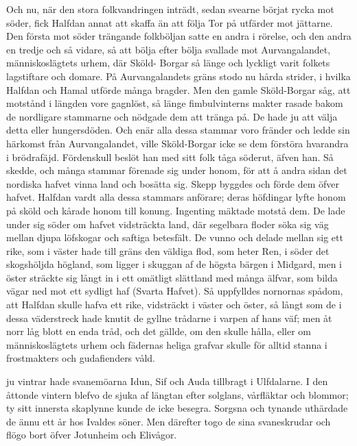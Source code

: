 Och nu, när den stora folkvandringen inträdt, sedan svearne börjat rycka
mot söder, fick Halfdan annat att skaffa än att följa Tor på utfärder
mot jättarne. Den första mot söder trängande folkböljan satte en andra i
rörelse, och den andra en tredje och så vidare, så att bölja efter bölja
svallade mot Aurvangalandet, människoslägtets urhem, där Sköld- Borgar
så länge och lyckligt varit folkets lagstiftare och domare. På
Aurvangalandets gräns stodo nu hårda strider, i hvilka Halfdan och Hamal
utförde många bragder. Men den gamle Sköld-Borgar såg, att motstånd i
längden vore gagnlöst, så länge fimbulvinterns makter rasade bakom de
nordligare stammarne och nödgade dem att tränga på. De hade ju att välja
detta eller hungersdöden. Och enär alla dessa stammar voro fränder och
ledde sin härkomst från
Aurvangalandet,
ville Sköld-Borgar icke se dem förstöra hvarandra i brödrafäjd.
Fördenskull beslöt han med sitt folk tåga söderut, äfven han. Så skedde,
och många stammar förenade sig under honom, för att å andra sidan det
nordiska hafvet vinna land och bosätta sig. Skepp byggdes och förde dem
öfver hafvet. Halfdan vardt alla dessa stammars anförare; deras
höfdingar lyfte honom på sköld och kårade honom till konung. Ingenting
mäktade motstå dem. De lade under sig söder om hafvet vidsträckta land,
där segelbara floder söka sig väg mellan djupa löfskogar och saftiga
betesfält. De vunno och delade mellan sig ett rike, som i väster hade
till gräns den väldiga flod, som heter Ren, i söder det skogshöljda
högland, som ligger i skuggan af de högsta bärgen i Midgard, men i öster
sträckte sig långt in i ett omätligt slättland med många älfvar, som
bilda vägar ned mot ett sydligt haf (Svarta Hafvet). Så uppfylldes
nornornas spådom, att Halfdan skulle hafva ett rike, vidsträckt i väster
och öster, så långt som de i dessa väderstreck hade knutit de gyllne
trådarne i varpen af hans väf; men åt norr låg blott en enda tråd, och
det gällde, om den skulle hålla, eller om människoslägtets urhem och
fädernas heliga grafvar skulle för alltid stanna i frostmakters och
gudafienders våld.

\endSecII


\dropcapS ju vintrar hade svanemöarna Idun, Sif och Auda tillbragt i Ulfdalarne.
I den åttonde vintern blefvo de sjuka af längtan efter solglans,
vårfläktar och blommor; ty sitt innersta skaplynne kunde de icke
besegra. Sorgsna och tynande uthärdade de ännu ett år hos Ivaldes söner.
Men därefter togo de sina svaneskrudar och flögo bort öfver Jotunheim
och Elivågor.

